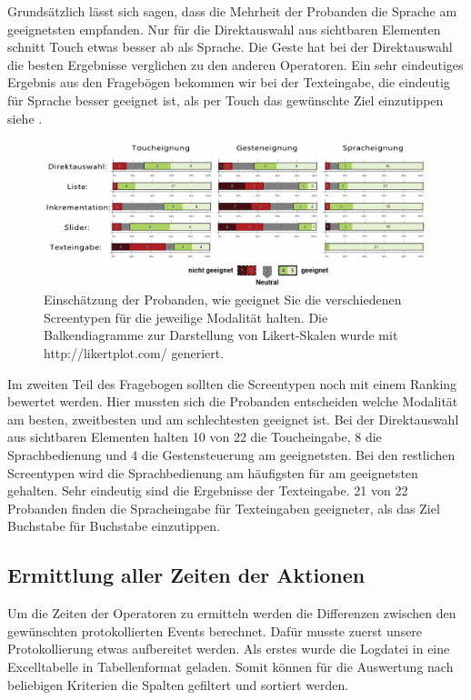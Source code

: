 Grundsätzlich lässt sich sagen, dass die Mehrheit der Probanden die Sprache am geeignetsten empfanden. Nur für die Direktauswahl aus sichtbaren Elementen schnitt Touch etwas besser ab als Sprache. 
Die Geste hat bei der Direktauswahl die besten Ergebnisse verglichen zu den anderen Operatoren. 
Ein sehr eindeutiges Ergebnis aus den Fragebögen bekommen wir bei der Texteingabe, die eindeutig für Sprache besser geeignet ist, als per Touch das gewünschte Ziel einzutippen siehe .
\begin{figure}[ht]
  \centering
  \includegraphics[width=1\textwidth]{img/Uebersicht_Eignung}
  \caption[Eignung des Screentypen]{Einschätzung der Probanden, wie geeignet Sie die verschiedenen Screentypen für die jeweilige Modalität halten. 
	Die Balkendiagramme zur Darstellung von Likert-Skalen wurde mit http://likertplot.com/ generiert.}
  \label{fig:Uebersicht_Eignung}
\end{figure}

Im zweiten Teil des Fragebogen sollten die Screentypen noch mit einem Ranking bewertet werden. 
Hier mussten sich die Probanden entscheiden welche Modalität am besten, zweitbesten und am schlechtesten geeignet ist. 
Bei der Direktauswahl aus sichtbaren Elementen halten 10 von 22 die Toucheingabe, 8 die Sprachbedienung und 4 die Gestensteuerung am geeignetsten. 
Bei den restlichen Screentypen wird die Sprachbedienung am häufigsten für am geeignetsten gehalten. 
Sehr eindeutig sind die Ergebnisse der Texteingabe. 
21 von 22 Probanden finden die Spracheingabe für Texteingaben geeigneter, als das Ziel Buchstabe für Buchstabe einzutippen.

\subsection[Ermittlung der Zeiten der Aktionen]{Ermittlung aller Zeiten der Aktionen}
Um die Zeiten der Operatoren zu ermitteln werden die Differenzen zwischen den gewünschten protokollierten Events berechnet. 
Dafür musste zuerst unsere Protokollierung etwas aufbereitet werden. 
Als erstes wurde die Logdatei in eine Excelltabelle in Tabellenformat geladen. 
Somit können für die Auswertung nach beliebigen Kriterien die Spalten gefiltert und sortiert werden. 

